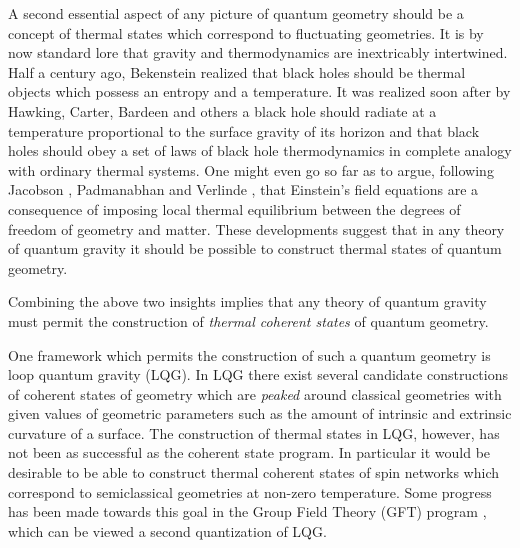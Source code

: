 \documentclass[twocolumn,draft,aps,nofootinbib,nobibnotes,final]{revtex4-2}
\begin{document}
A second essential aspect of any picture of quantum geometry should be a concept of thermal states which correspond to fluctuating geometries. It is by now standard lore that gravity and thermodynamics are inextricably intertwined. Half a century ago, Bekenstein realized that black holes should be thermal objects which possess an entropy and a temperature. It was realized soon after by Hawking, Carter, Bardeen and others a black hole should radiate at a temperature proportional to the surface gravity of its horizon and that black holes should obey a set of laws of black hole thermodynamics in complete analogy with ordinary thermal systems. One might even go so far as to argue, following Jacobson , Padmanabhan  and Verlinde , that Einstein's field equations are a consequence of imposing local thermal equilibrium between the degrees of freedom of geometry and matter. These developments suggest that in any theory of quantum gravity it should be possible to construct thermal states of quantum geometry.

Combining the above two insights implies that any theory of quantum gravity must permit the construction of \textit{thermal coherent states} of quantum geometry.

One framework which permits the construction of such a quantum geometry is loop quantum gravity (LQG). In LQG there exist several candidate constructions of coherent states of geometry which are \textit{peaked} around classical geometries with given values of geometric parameters such as the amount of intrinsic and extrinsic curvature of a surface. The construction of thermal states in LQG, however, has not been as successful as the coherent state program. In particular it would be desirable to be able to construct thermal coherent states of spin networks which correspond to semiclassical geometries at non-zero temperature. Some progress has been made towards this goal in the Group Field Theory (GFT) program , which can be viewed a second quantization of LQG.
\end{document}
